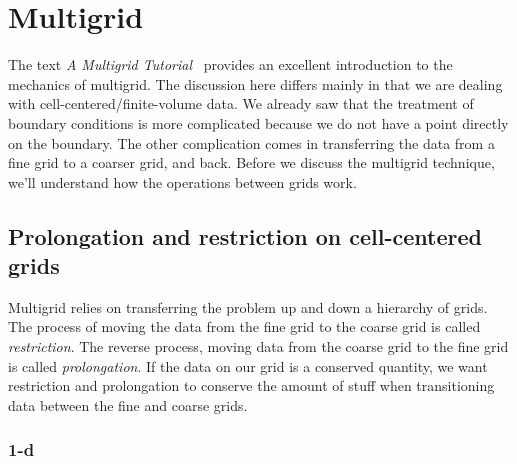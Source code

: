 \section{Multigrid}

The text {\em A Multigrid Tutorial}~\cite{multigridtutorial} provides
an excellent introduction to the mechanics of multigrid.  The
discussion here differs mainly in that we are dealing with
cell-centered/finite-volume data.  We already saw that the treatment
of boundary conditions is more complicated because we do not have a
point directly on the boundary.  The other complication comes in
transferring the data from a fine grid to a coarser grid, and back.
Before we discuss the multigrid technique, we'll understand how
the operations between grids work.


\subsection{Prolongation and restriction on cell-centered grids}

Multigrid relies on transferring the problem up and down a hierarchy of
grids. 
The process of moving the data from the fine grid to the coarse grid
is called {\em restriction}.  The reverse process, moving data from
the coarse grid to the fine grid is called {\em prolongation}.  If the
data on our grid is a conserved quantity, we want restriction and prolongation to
conserve the amount of stuff when transitioning data between the fine and coarse grids.


\subsubsection{1-d}

